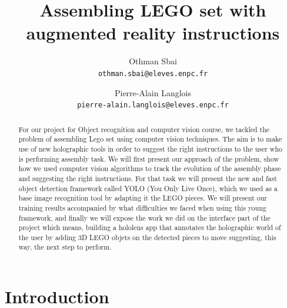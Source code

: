 \documentclass[10pt,twocolumn,letterpaper]{article}
\begin{document}
\title{Assembling LEGO set with augmented reality instructions}

\author{Othman Sbai\\
{\tt\small othman.sbai@eleves.enpc.fr}
\and
Pierre-Alain Langlois\\
{\tt\small pierre-alain.langlois@eleves.enpc.fr}
}

\maketitle

\begin{abstract}
   For our project for Object recognition and computer vision course, we tackled the problem of assembling Lego set using computer vision techniques. The aim is to make use of new holographic tools in order to suggest the right instructions to the user who is performing assembly task. We will first present our approach of the problem, show how we used computer vision algorithms to track the evolution of the assembly phase and suggesting the right instructions. For that task we will present the new and fast object detection framework called YOLO (You Only Live Once), which we used as a base image recognition tool by adapting it the LEGO pieces. We will present our training results accompanied by what difficulties we faced when using this young framework, and finally we will expose the work we did on the interface part of the project which means, building a hololens app that annotates the holographic world of the user by adding 3D LEGO objets on the detected pieces to move suggesting, this way, the next step to perform.
\end{abstract}

\section{Introduction}
\end{document}
